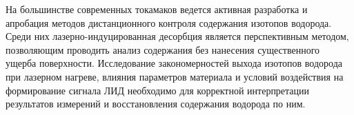 На большинстве современных токамаков ведется активная разработка и апробация методов дистанционного контроля содержания изотопов водорода. Среди них лазерно-индуцированная десорбция является перспективным методом, позволяющим проводить анализ содержания без нанесения существенного ущерба поверхности. Исследование закономерностей выхода изотопов водорода при лазерном нагреве, влияния параметров материала и условий воздействия на формирование сигнала ЛИД необходимо для корректной интерпретации результатов измерений и восстановления содержания водорода по ним.

